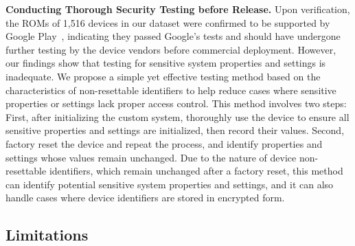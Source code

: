 \noindent \textbf{Conducting Thorough Security Testing before Release.}
Upon verification, the ROMs of 1,516 devices in our dataset were confirmed to be supported by Google Play~\cite{playsupported}, indicating they passed Google's tests and should have undergone further testing by the device vendors before commercial deployment.
However, our findings show that testing for sensitive system properties and settings is inadequate.
We propose a simple yet effective testing method based on the characteristics of non-resettable identifiers to help reduce cases where sensitive properties or settings lack proper access control. 
This method involves two steps: First, after initializing the custom system, thoroughly use the device to ensure all sensitive properties and settings are initialized, then record their values. 
Second, factory reset the device and repeat the process, and identify properties and settings whose values remain unchanged.
Due to the nature of device non-resettable identifiers, which remain unchanged after a factory reset, this method can identify potential sensitive system properties and settings, and it can also handle cases where device identifiers are stored in encrypted form.



\subsection{Limitations}
\label{sec:limitations}

